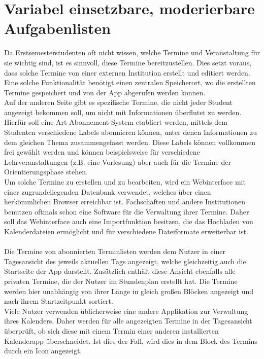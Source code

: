 \documentclass[noindent]{tudreport}
\begin{document}
		\section{Variabel einsetzbare, moderierbare Aufgabenlisten}\label{sec:todo_list}
			Da Erstsemesterstudenten oft nicht wissen, welche Termine und Veranstaltung für sie wichtig sind, ist es sinnvoll, diese Termine bereitzustellen. Dies setzt voraus, dass solche Termine von einer externen Institution erstellt und editiert werden. Eine solche Funktionalität benötigt einen zentralen Speicherort, wo die erstellten Termine gespeichert und von der App abgerufen werden können.\\
			Auf der anderen Seite gibt es spezifische Termine, die nicht jeder Student angezeigt bekommen soll, um nicht mit Informationen überflutet zu werden. Hierfür soll eine Art Abonnement-System etabliert werden, mittels dem Studenten verschiedene Labels abonnieren können, unter denen Informationen zu dem gleichen Thema zusammengefasst werden. Diese Labels können vollkommen frei gewählt werden und können beispielsweise für verschiedene Lehrveranstaltungen (z.B. eine Vorlesung) aber auch für die Termine der Orientierungsphase stehen.\\
			Um solche Termine zu erstellen und zu bearbeiten, wird ein Webinterface mit einer zugrundeliegenden Datenbank verwendet, welches über einen herkömmlichen Browser erreichbar ist. Fachschaften und andere Institutionen benutzen oftmals schon eine Software für die Verwaltung ihrer Termine. Daher soll das Webinterface auch eine Importfunktion besitzen, die das Hochladen von Kalenderdateien ermöglicht und für verschiedene Dateiformate erweiterbar ist.\\\\
			Die Termine von abonnierten Terminlisten werden dem Nutzer in einer Tagesansicht des jeweils aktuellen Tags angezeigt, welche gleichzeitig auch die Startseite der App darstellt. Zusätzlich enthält diese Ansicht ebenfalls alle privaten Termine, die der Nutzer im Stundenplan erstellt hat. Die Termine werden hier unabhängig von ihrer Länge in gleich großen Blöcken angezeigt und nach ihrem Startzeitpunkt sortiert.\\
			Viele Nutzer verwenden üblicherweise eine andere Applikation zur Verwaltung ihres Kalenders. Daher werden für alle angezeigten Termine in der Tagesansicht überprüft, ob sich diese mit einem Termin einer anderen installierten Kalenderapp überschneidet. Ist dies der Fall, wird dies in dem Block des Termins durch ein Icon angezeigt.
		
\end{document}
